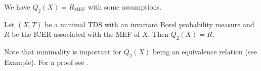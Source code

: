 \begin{frame}
  We have $Q_2(X) = R_{\text{MEF}}$ with some assumptions.
\begin{theorem}
  Let $(X, T)$ be a minimal TDS with an invariant Borel probability measure
  and $R$ be the ICER associated with the MEF of $X$.
  Then $Q_2(X) = R$.
\end{theorem}
  Note that minimality is important for $Q_2(X)$ being an equivalence relation (see Example).
  For a proof see \cite[p.130, Thm. 8.]{Auslaner}.
\end{frame}
